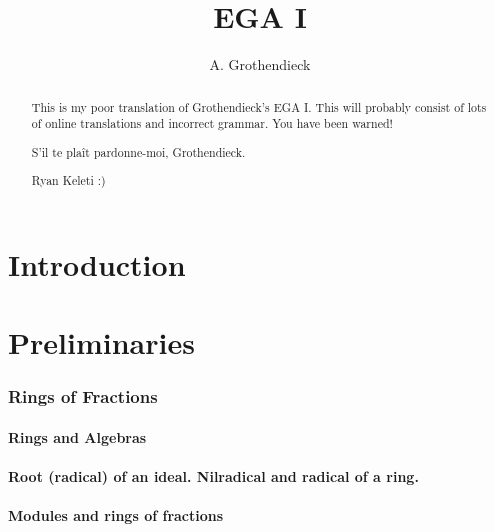 \documentclass[10pt]{amsart}
\title{EGA I}
\author{A. Grothendieck}
\begin{document}
\renewcommand{\abstractname}{What this is}
\begin{abstract}
    This is my poor translation of Grothendieck's EGA I. This
    will probably consist of lots of online translations and incorrect grammar.
    You have been warned!

    S'il te pla\^it pardonne-moi, Grothendieck.

    Ryan Keleti :)
\end{abstract}

\maketitle

\noindent\hspace{0.15\linewidth}
\begin{minipage}{0.7\linewidth}
    \tableofcontents{}
\end{minipage}


\clearpage


\part*{Introduction}



\clearpage


\setcounter{part}{-1}

\part{Preliminaries}

    \section{Rings of Fractions}

        \subsection{Rings and Algebras}
        

        \subsection{Root (radical) of an ideal. Nilradical and radical of a ring.}
        

        \subsection{Modules and rings of fractions}
        
\end{document}
